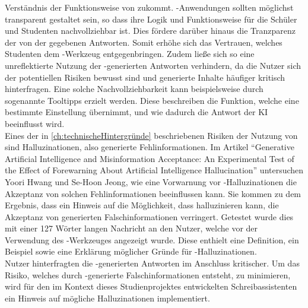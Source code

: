 \documentclass[../main.tex]{subfiles}
\begin{document}
Verständnis der Funktionsweise von  zukommt. -Anwendungen sollten möglichst transparent gestaltet sein, so dass ihre Logik und Funktionsweise für die Schüler und 
Studenten nachvollziehbar ist. Dies fördere darüber hinaus die Tranzparenz der von der  gegebenen Antworten. Somit erhöhe sich das Vertrauen, welches Studenten dem -Werkzeug 
entgegenbringen\cite[10]{influencingUsingAi}. Zudem ließe sich so eine unreflektierte Nutzung der -generierten Antworten verhindern, da die Nutzer sich der 
potentiellen Risiken bewusst sind und generierte Inhalte häufiger kritisch hinterfragen\cite[10]{influencingUsingAi}. Eine solche Nachvollziehbarkeit kann 
beispielsweise durch sogenannte Tooltipps erzielt werden. Diese beschreiben die Funktion, welche eine bestimmte Einstellung übernimmt, und wie dadurch die Antwort der 
KI beeinflusst wird.\\  
Eines der in \autoref{ch:technischeHintergründe} beschriebenen Risiken der Nutzung von  sind Halluzinationen, also generierte Fehlinformationen. Im Artikel "`Generative Artificial Intelligence 
and Misinformation Acceptance: An Experimental Test of the Effect of Forewarning About Artificial Intelligence Hallucination"' untersuchen Yoori Hwang und Se-Hoon Jeong, 
wie eine Vorwarnung vor -Halluzinationen die Akzeptanz von solchen Fehlinformationen beeinflussen kann. Sie kommen zu dem Ergebnis, dass ein Hinweis auf 
die Möglichkeit, dass  halluzinieren kann, die Akzeptanz von generierten Falschinformationen verringert. Getestet wurde dies mit einer 127 Wörter langen Nachricht an 
den Nutzer, welche vor der Verwendung des -Werkzeuges angezeigt wurde. Diese enthielt eine Definition, ein Beispiel sowie eine Erklärung möglicher Gründe für -Halluzinationen\cite[285]{hallucinationForewarning}. \\Nutzer hinterfragten die -generierten Antworten im Anschluss kritischer. Um das Risiko, welches durch -generierte Falschinformationen 
entsteht, zu minimieren, wird für den im Kontext dieses Studienprojektes entwickelten Schreibassistenten ein Hinweis auf mögliche Halluzinationen implementiert.\cite{hallucinationForewarning}
\end{document}

